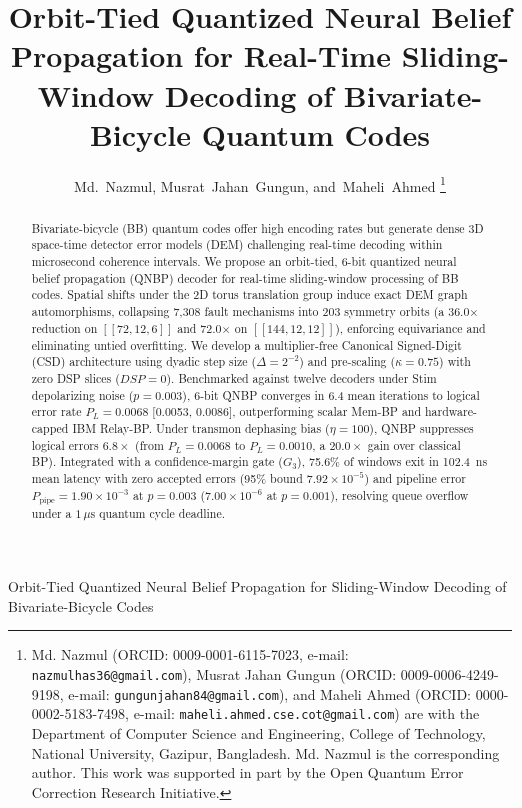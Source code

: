 \documentclass[journal]{IEEEtran}
\begin{document}
\title{Orbit-Tied Quantized Neural Belief Propagation for Real-Time Sliding-Window Decoding of Bivariate-Bicycle Quantum Codes}

\author{Md.~Nazmul,
        Musrat~Jahan~Gungun,
        and~Maheli~Ahmed%
\thanks{Md. Nazmul (ORCID: 0009-0001-6115-7023, e-mail: \texttt{nazmulhas36@gmail.com}), Musrat Jahan Gungun (ORCID: 0009-0006-4249-9198, e-mail: \texttt{gungunjahan84@gmail.com}), and Maheli Ahmed (ORCID: 0000-0002-5183-7498, e-mail: \texttt{maheli.ahmed.cse.cot@gmail.com}) are with the Department of Computer Science and Engineering, College of Technology, National University, Gazipur, Bangladesh. Md. Nazmul is the corresponding author. This work was supported in part by the Open Quantum Error Correction Research Initiative.}}

%
{Orbit-Tied Quantized Neural Belief Propagation for Sliding-Window Decoding of Bivariate-Bicycle Codes}

\maketitle

\begin{abstract}
Bivariate-bicycle (BB) quantum codes offer high encoding rates but generate dense 3D space-time detector error models (DEM) challenging real-time decoding within microsecond coherence intervals. We propose an orbit-tied, 6-bit quantized neural belief propagation (QNBP) decoder for real-time sliding-window processing of BB codes. Spatial shifts under the 2D torus translation group induce exact DEM graph automorphisms, collapsing 7,308 fault mechanisms into 203 symmetry orbits (a 36.0$\times$ reduction on $[[72,12,6]]$ and 72.0$\times$ on $[[144,12,12]]$), enforcing equivariance and eliminating untied overfitting. We develop a multiplier-free Canonical Signed-Digit (CSD) architecture using dyadic step size ($\Delta = 2^{-2}$) and pre-scaling ($\kappa = 0.75$) with zero DSP slices ($DSP=0$). Benchmarked against twelve decoders under Stim depolarizing noise ($p = 0.003$), 6-bit QNBP converges in 6.4 mean iterations to logical error rate $P_L = 0.0068$ [0.0053, 0.0086], outperforming scalar Mem-BP and hardware-capped IBM Relay-BP. Under transmon dephasing bias ($\eta = 100$), QNBP suppresses logical errors $6.8\times$ (from $P_L = 0.0068$ to $P_L = 0.0010$, a $20.0\times$ gain over classical BP). Integrated with a confidence-margin gate ($G_3$), 75.6\% of windows exit in 102.4~ns mean latency with zero accepted errors (95\% bound $7.92 \times 10^{-5}$) and pipeline error $P_{\text{pipe}} = 1.90 \times 10^{-3}$ at $p = 0.003$ ($7.00 \times 10^{-6}$ at $p = 0.001$), resolving queue overflow under a $1\,\mu\text{s}$ quantum cycle deadline.
\end{abstract}
\end{document}
